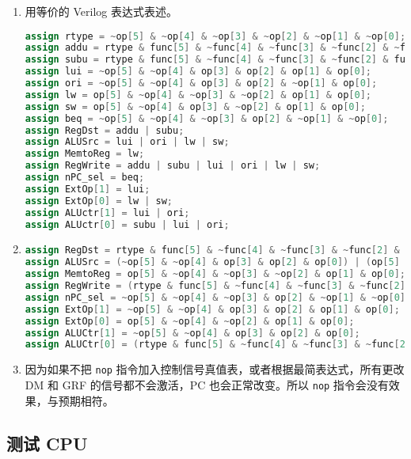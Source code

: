 \documentclass[12pt,AutoFakeBold]{article}
\begin{document}
\begin{enumerate}
\item 用等价的 Verilog 表达式表述。
\begin{lstlisting}[language=Verilog]
assign rtype = ~op[5] & ~op[4] & ~op[3] & ~op[2] & ~op[1] & ~op[0];
assign addu = rtype & func[5] & ~func[4] & ~func[3] & ~func[2] & ~func[1] & func[0];
assign subu = rtype & func[5] & ~func[4] & ~func[3] & ~func[2] & func[1] & func[0];
assign lui = ~op[5] & ~op[4] & op[3] & op[2] & op[1] & op[0];
assign ori = ~op[5] & ~op[4] & op[3] & op[2] & ~op[1] & op[0];
assign lw = op[5] & ~op[4] & ~op[3] & ~op[2] & op[1] & op[0];
assign sw = op[5] & ~op[4] & op[3] & ~op[2] & op[1] & op[0];
assign beq = ~op[5] & ~op[4] & ~op[3] & op[2] & ~op[1] & ~op[0];
assign RegDst = addu | subu;
assign ALUSrc = lui | ori | lw | sw;
assign MemtoReg = lw;
assign RegWrite = addu | subu | lui | ori | lw | sw;
assign nPC_sel = beq;
assign ExtOp[1] = lui;
assign ExtOp[0] = lw | sw;
assign ALUctr[1] = lui | ori;
assign ALUctr[0] = subu | lui | ori;
\end{lstlisting}
\item \begin{lstlisting}[language=Verilog]
assign RegDst = rtype & func[5] & ~func[4] & ~func[3] & ~func[2] & func[0];
assign ALUSrc = (~op[5] & ~op[4] & op[3] & op[2] & op[0]) | (op[5] & ~op[4] & ~op[2] & op[1] & op[0]);
assign MemtoReg = op[5] & ~op[4] & ~op[3] & ~op[2] & op[1] & op[0];
assign RegWrite = (rtype & func[5] & ~func[4] & ~func[3] & ~func[2] & func[0]) | (~op[5] & ~op[4] & op[3] & op[2] & ~op[0]) | (op[5] & ~op[4] & ~op[2] & op[1] & op[0]);
assign nPC_sel = ~op[5] & ~op[4] & ~op[3] & op[2] & ~op[1] & ~op[0];
assign ExtOp[1] = ~op[5] & ~op[4] & op[3] & op[2] & op[1] & op[0];
assign ExtOp[0] = op[5] & ~op[4] & ~op[2] & op[1] & op[0];
assign ALUCtr[1] = ~op[5] & ~op[4] & op[3] & op[2] & op[0];
assign ALUCtr[0] = (rtype & func[5] & ~func[4] & ~func[3] & ~func[2] & func[1] & func[0] & ~op[5] & ~op[4] & op[3] & op[2] & op[0];
\end{lstlisting}
\item 因为如果不把 \texttt{nop} 指令加入控制信号真值表，或者根据最简表达式，所有更改 DM 和 GRF 的信号都不会激活，PC 也会正常改变。所以 \texttt{nop} 指令会没有效果，与预期相符。

\end{enumerate}

\subsection{测试 CPU}
\end{document}
